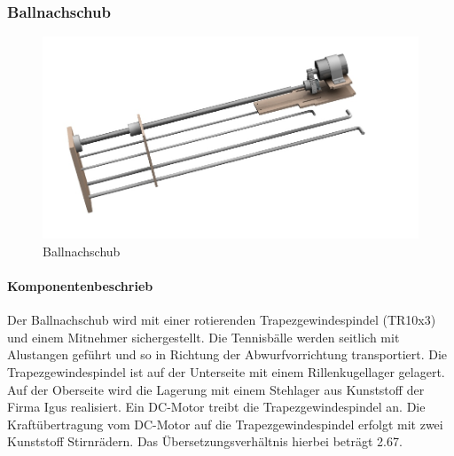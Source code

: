\subsubsection{Ballnachschub}
\begin{figure}[h!]
	\centering
	\includegraphics[width=\linewidth]{../../fig/Ballnachschub}
	\caption{Ballnachschub}
	\label{fig:Ballnachschub}
\end{figure}
\paragraph{Komponentenbeschrieb\\}
Der Ballnachschub wird mit einer rotierenden Trapezgewindespindel (TR10x3) und einem Mitnehmer sichergestellt. Die Tennisbälle werden seitlich mit Alustangen geführt und so in Richtung der Abwurfvorrichtung transportiert. Die Trapezgewindespindel ist auf der Unterseite mit einem Rillenkugellager gelagert. Auf der Oberseite wird die Lagerung mit einem Stehlager aus Kunststoff der Firma Igus realisiert. Ein DC-Motor treibt die Trapezgewindespindel an. Die Kraftübertragung vom DC-Motor auf die Trapezgewindespindel erfolgt mit zwei Kunststoff Stirnrädern. Das Übersetzungsverhältnis hierbei beträgt 2.67.

